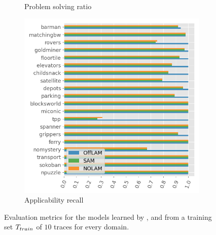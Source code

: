 \begin{figure}[ht]
\begin{subfigure}[b]{\columnwidth}
    \caption{Problem solving ratio}
    \label{fig:solving-ratio}
  \end{subfigure}
  \hfill
  \begin{subfigure}[b]{\columnwidth}
    \includegraphics[width=\textwidth]{figures/10_traces_mini/app_recall.png}
    \caption{Applicability recall}
  \end{subfigure}




  \caption{Evaluation metrics for the models learned by \samshort{}, \offlam{} and \nolam{} from a training set $T_{train}$ of $10$ traces for every domain.}
  \label{fig:exp-mini}
\end{figure} 